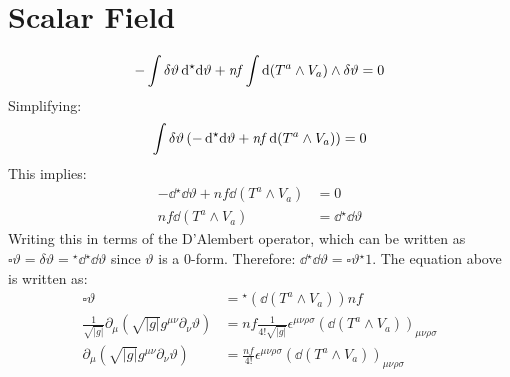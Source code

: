 \documentclass[12pt]{article}
\newcommand{\hodge}{{^\star}}
\begin{document}
\section{Scalar Field}
\begin{align*}
  - \int \var{\vartheta}\dd{\hodge{\dd{\vartheta}}} + \mathit{nf} \int \dd(T^a \wedge V_a) \wedge \var{\vartheta} = 0
\end{align*}
Simplifying:
\begin{align*}
  \int \var{\vartheta} \left(-\dd{\hodge{\dd{\vartheta}}} + \mathit{nf} \dd(T^a \wedge V_a) \right) = 0
\end{align*}
This implies:
\begin{align*}
  -\dd{\hodge{\dd{\vartheta}}} + \mathit{nf} \dd(T^a \wedge V_a) &= 0 \\
  \mathit{nf} \dd(T^a \wedge V_a) &= \dd{\hodge{\dd{\vartheta}}}
\end{align*}
Writing this in terms of the D'Alembert operator, which can be written as $\square \vartheta = \delta \vartheta = \hodge{\dd}\hodge{\dd\vartheta}$ since $\vartheta$ is a 0-form. Therefore: $\dd \hodge{\dd\vartheta} = \square \vartheta \hodge{1}$. The equation above is written as:
\begin{align*}
  \square \vartheta &= \hodge{\left(\dd(T^a \wedge V_a)\right)} nf \\
  \frac{1}{\sqrt{|g|}} \partial_\mu\left(\sqrt{|g|}g^{\mu\nu}\partial_\nu \vartheta \right) &= nf \frac{1}{4!\sqrt{|g|}}\epsilon^{\mu\nu\rho\sigma}\left(\dd(T^a \wedge V_a)\right)_{\mu\nu\rho\sigma} \\
  \partial_\mu\left(\sqrt{|g|}g^{\mu\nu}\partial_\nu \vartheta \right) &= \frac{nf}{4!}\epsilon^{\mu\nu\rho\sigma}\left(\dd(T^a \wedge V_a)\right)_{\mu\nu\rho\sigma}
\end{align*}
\end{document}
